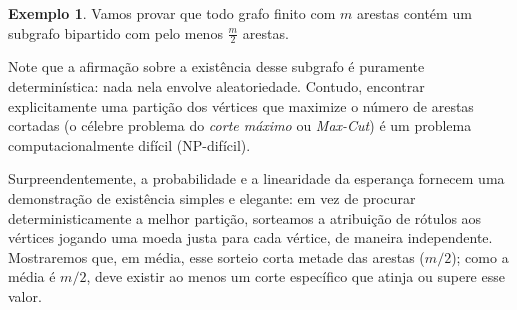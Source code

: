 \documentclass[12pt,portuguese]{article}
\theoremstyle{definition}
\newtheorem{example}[example]{Exemplo}
\begin{document}
\begin{example}\label{ex:corte-aleatorio-grafo}
Vamos provar que todo grafo finito com $m$ arestas contém um subgrafo
bipartido com pelo menos $\displaystyle\frac{m}{2}$ arestas.


\bigskip 
Note que a afirmação sobre a existência desse subgrafo é puramente
determinística: nada nela envolve aleatoriedade. Contudo, encontrar
explicitamente uma partição dos vértices que maximize o número de arestas
cortadas (o célebre problema do \emph{corte máximo} ou \emph{Max-Cut}) é
um problema computacionalmente difícil (NP-difícil).

Surpreendentemente, a probabilidade e a linearidade da esperança fornecem uma
demonstração de existência simples e elegante: em vez de procurar deterministicamente
a melhor partição, sorteamos a atribuição de rótulos aos vértices jogando uma moeda
justa para cada vértice, de maneira independente. Mostraremos que, em média,
esse sorteio corta metade das arestas ($m/2$); como a média é $m/2$, deve existir
ao menos um corte específico que atinja ou supere esse valor.


\end{example}
\end{document}

